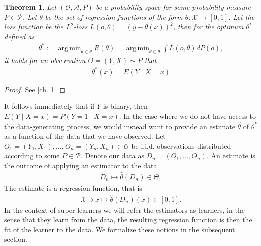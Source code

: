 \documentclass[11pt, a4paper]{article}
\DeclareMathOperator*{\argmin}{arg\,min}
\newtheorem{theorem}{Theorem}
\theoremstyle{definition}
\theoremstyle{remark}
\newcommand{\btheta}{\theta}
\begin{document}
\begin{theorem}
    Let $ (\mathcal{O} , \mathcal{A}, P) $ be a probability space for some probability measure $ P \in \mathcal{P} $. Let $ \btheta $ be the set of regression functions of the form $ \btheta : \mathcal{X} \to [0,1] $. Let the loss function be the $ L^2 $-loss $ L(o, \btheta) = (y - \btheta(x))^2 $, then for the optimum $ \btheta^* $ defined as 
    \begin{align*}
        \btheta^* := \argmin_{\btheta \in \btheta} R(\btheta)= \argmin_{\btheta \in \btheta} \int L(o, \btheta)  dP(o),
    \end{align*}
    it holds for an observation $ O = (Y, X) \sim P $ that
    \begin{align*}
        \btheta^{*}(x) = E(Y \mid X = x) 
    \end{align*}
\end{theorem}
\begin{proof}
    See \cite{gyorfi2002distribution}[ch. 1]
\end{proof}
It follows immediately that if $ Y $ is binary, then $ E(Y \mid X = x) = P(Y = 1 \mid X = x) $.  
In the case where we do not have access to the data-generating process, we would instead want to provide an estimate $ \hat{\btheta} $ of $ \btheta^*$ as a function of the data that we have observed. Let $ O_1 = (Y_1 , X_1) ,\ldots, O_n = (Y_n , X_n) \in  \mathcal{O} $ be i.i.d. observations distributed according to some $ P \in \mathcal{P} $. Denote our data as $ D_n = (O_1, \dots , O_n)$. An estimate is the outcome of applying an estimator to the data 
\begin{align*}
    D_n \mapsto \hat{\btheta}(D_n) \in \Theta,   
\end{align*}
The estimate is a regression function, that is 
\begin{align*}
    \mathcal{X} \ni x \mapsto \hat{\btheta}(D_n)(x) \in [0,1].
\end{align*}
In the context of super learners we will refer the estimators as learners, in the sense that they learn from the data, the resulting regression function is then the fit of the learner to the data. We formalize these notions in the subsequent section. 
\end{document}
